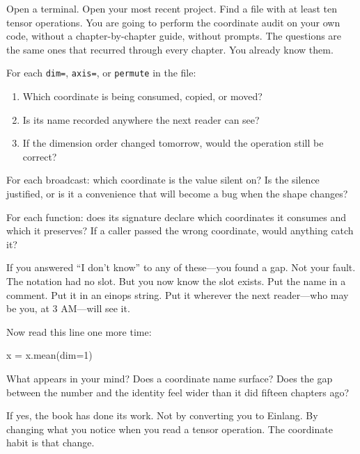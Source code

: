 \documentclass[11pt,titlepage]{article}
\newenvironment{Shaded}{}{}
\newcommand{\DecValTok}[1]{\textcolor[rgb]{0.25,0.63,0.44}{#1}}
\newcommand{\NormalTok}[1]{#1}
\newcommand{\OperatorTok}[1]{\textcolor[rgb]{0.40,0.40,0.40}{#1}}
\providecommand{\tightlist}{%
  \setlength{\itemsep}{0pt}\setlength{\parskip}{0pt}}
\begin{document}
Open a terminal. Open your most recent project. Find a file with at
least ten tensor operations. You are going to perform the coordinate
audit on your own code, without a chapter-by-chapter guide, without
prompts. The questions are the same ones that recurred through every
chapter. You already know them.

For each \texttt{dim=}, \texttt{axis=}, or \texttt{permute} in the file:

\begin{enumerate}
\def\labelenumi{\arabic{enumi}.}
\tightlist
\item
  Which coordinate is being consumed, copied, or moved?
\item
  Is its name recorded anywhere the next reader can see?
\item
  If the dimension order changed tomorrow, would the operation still be
  correct?
\end{enumerate}

For each broadcast: which coordinate is the value silent on? Is the
silence justified, or is it a convenience that will become a bug when
the shape changes?

For each function: does its signature declare which coordinates it
consumes and which it preserves? If a caller passed the wrong
coordinate, would anything catch it?

If you answered ``I don't know'' to any of these---you found a gap. Not
your fault. The notation had no slot. But you now know the slot exists.
Put the name in a comment. Put it in an einops string. Put it wherever
the next reader---who may be you, at 3 AM---will see it.

Now read this line one more time:

\begin{Shaded}
\begin{Highlighting}[]
\NormalTok{x }\OperatorTok{=}\NormalTok{ x.mean(dim}\OperatorTok{=}\DecValTok{1}\NormalTok{)}
\end{Highlighting}
\end{Shaded}

What appears in your mind? Does a coordinate name surface? Does the gap
between the number and the identity feel wider than it did fifteen
chapters ago?

If yes, the book has done its work. Not by converting you to Einlang. By
changing what you notice when you read a tensor operation. The
coordinate habit is that change.

\vspace{2em}
\end{document}
